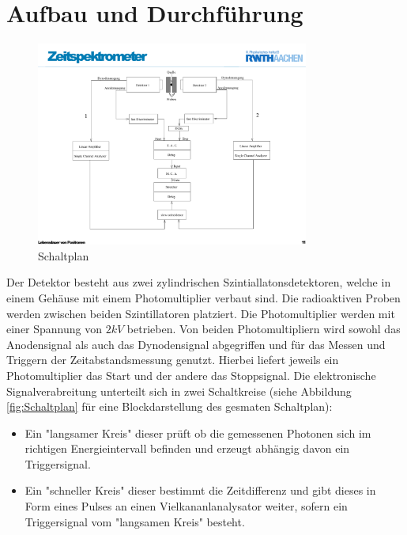 \documentclass[a4paper,12pt]{article}
\begin{document}
\section{Aufbau und Durchführung}
\begin{figure}[htb]
		\centering
		\includegraphics[width=0.8\textwidth]{schaltplan.pdf}
		\caption{Schaltplan}
		\label{fig:schaltplan}
\end{figure}
Der Detektor besteht aus zwei zylindrischen Szintiallatonsdetektoren,
 welche in einem Gehäuse mit einem Photomultiplier verbaut sind. Die radioaktiven Proben werden zwischen beiden Szintillatoren
platziert. Die Photomultiplier werden mit einer Spannung von $2\si{kV}$ betrieben. Von beiden Photomultipliern
wird sowohl das Anodensignal als auch das Dynodensignal abgegriffen und für das Messen und Triggern der 
Zeitabstandsmessung genutzt. Hierbei liefert jeweils ein Photomultiplier das Start und der andere 
das Stoppsignal.
Die elektronische Signalverabreitung unterteilt sich in zwei Schaltkreise
 (siehe Abbildung \ref{fig:Schaltplan} für eine Blockdarstellung des gesmaten Schaltplan): \\
\begin{itemize}
	\item
	Ein "langsamer Kreis" dieser prüft ob die gemessenen Photonen sich im richtigen Energieintervall 
	befinden und erzeugt abhängig davon ein Triggersignal.
	\item Ein "schneller Kreis" dieser bestimmt die Zeitdifferenz und gibt dieses in Form eines Pulses an einen
	Vielkananlanalysator weiter, sofern ein Triggersignal vom "langsamen Kreis" besteht.	
\end{itemize}
\end{document}

